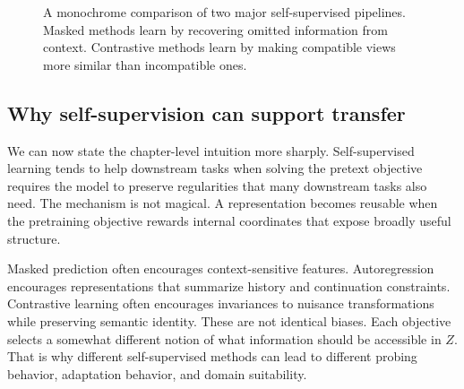 \begin{figure}[h]
\centering
{}
\caption{A monochrome comparison of two major self-supervised pipelines.
Masked methods learn by recovering omitted information from context.
Contrastive methods learn by making compatible views more similar than incompatible ones.}
\end{figure}

\subsection*{Why self-supervision can support transfer}

We can now state the chapter-level intuition more sharply.
Self-supervised learning tends to help downstream tasks when solving the pretext objective requires the model to preserve regularities that many downstream tasks also need.
The mechanism is not magical.
A representation becomes reusable when the pretraining objective rewards internal coordinates that expose broadly useful structure.

Masked prediction often encourages context-sensitive features.
Autoregression encourages representations that summarize history and continuation constraints.
Contrastive learning often encourages invariances to nuisance transformations while preserving semantic identity.
These are not identical biases.
Each objective selects a somewhat different notion of what information should be accessible in $Z$.
That is why different self-supervised methods can lead to different probing behavior, adaptation behavior, and domain suitability.

